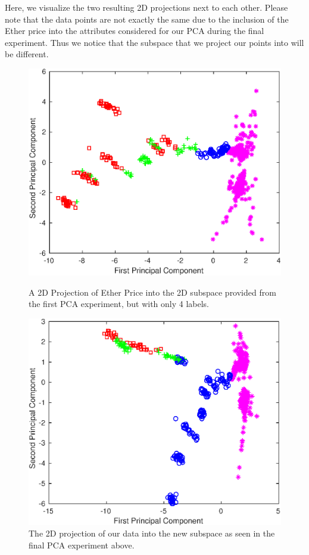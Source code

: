 \documentclass{article}
\begin{document}
Here, we visualize the two resulting 2D projections next to each other. Please note that the data points are  not exactly the same due to the inclusion of the Ether price into the attributes considered for our PCA during the final experiment. Thus we notice that the subspace that we project our points into will be different.

\begin{figure}[H]
  \centering
  \begin{minipage}[b]{0.4\textwidth}
    \includegraphics[width=\textwidth]{main/eth_2d_projection_4Labels.eps}
    \caption{A 2D Projection of Ether Price into the 2D subspace provided from the first PCA experiment, but with only 4 labels.}
  \end{minipage}
  \hfill
  \begin{minipage}[b]{0.4\textwidth}
    \includegraphics[width=\textwidth]{final/btc_2d_projection.eps}
    \caption{The 2D projection of our data into the new subspace as seen in the final PCA experiment above.}
  \end{minipage}
\end{figure}
\end{document}
